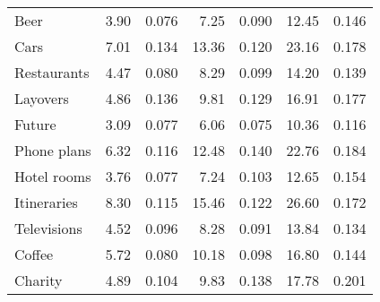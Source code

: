 \begin{tabular}[t]{lrrrrrr}
Beer & 3.90 & 0.076 & 7.25 & 0.090 & 12.45 & 0.146\\
Cars & 7.01 & 0.134 & 13.36 & 0.120 & 23.16 & 0.178\\
Restaurants & 4.47 & 0.080 & 8.29 & 0.099 & 14.20 & 0.139\\
\addlinespace
Layovers & 4.86 & 0.136 & 9.81 & 0.129 & 16.91 & 0.177\\
Future & 3.09 & 0.077 & 6.06 & 0.075 & 10.36 & 0.116\\
Phone plans & 6.32 & 0.116 & 12.48 & 0.140 & 22.76 & 0.184\\
Hotel rooms & 3.76 & 0.077 & 7.24 & 0.103 & 12.65 & 0.154\\
Itineraries & 8.30 & 0.115 & 15.46 & 0.122 & 26.60 & 0.172\\
\addlinespace
Televisions & 4.52 & 0.096 & 8.28 & 0.091 & 13.84 & 0.134\\
Coffee & 5.72 & 0.080 & 10.18 & 0.098 & 16.80 & 0.144\\
Charity & 4.89 & 0.104 & 9.83 & 0.138 & 17.78 & 0.201\\
\bottomrule
\end{tabular}
